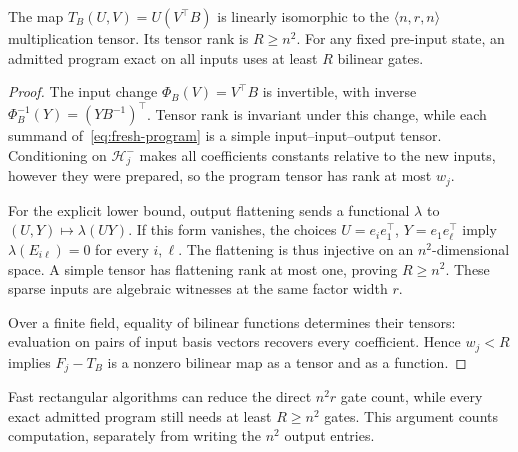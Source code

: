 \begin{lemma}\label{lem:fresh-tensor}
The map $T_B(U,V)=U(V^\top B)$ is linearly isomorphic to the
$\langle n,r,n\rangle$ multiplication tensor. Its tensor rank is
$R\ge n^2$. For any fixed pre-input state, an admitted program exact on
all inputs uses at least $R$ bilinear gates.
\end{lemma}
\begin{proof}
The input change $\Phi_B(V)=V^\top B$ is invertible, with inverse
$\Phi_B^{-1}(Y)=(YB^{-1})^\top$. Tensor rank is invariant under this
change, while each summand of~\eqref{eq:fresh-program} is a simple
input--input--output tensor. Conditioning on $\mathcal H_j^-$ makes
all coefficients constants relative to the new inputs, however they were
prepared, so the program tensor has rank at most $w_j$.

For the explicit lower bound, output flattening sends a functional
$\lambda$ to $(U,Y)\mapsto\lambda(UY)$. If this form vanishes,
the choices $U=e_i e_1^\top$, $Y=e_1 e_\ell^\top$ imply
$\lambda(E_{i\ell})=0$ for every $i,\ell$. The flattening is thus
injective on an $n^2$-dimensional space. A simple tensor has flattening
rank at most one, proving $R\ge n^2$. These sparse inputs are algebraic
witnesses at the same factor width $r$.

Over a finite field, equality of bilinear functions determines their
tensors: evaluation on pairs of input basis vectors recovers every
coefficient. Hence $w_j<R$ implies $F_j-T_B$ is a nonzero bilinear
map as a tensor and as a function.
\end{proof}

Fast rectangular algorithms can reduce the direct $n^2r$ gate count,
while every exact admitted program still needs at least $R\ge n^2$
gates. This argument counts computation, separately from writing the
$n^2$ output entries.

